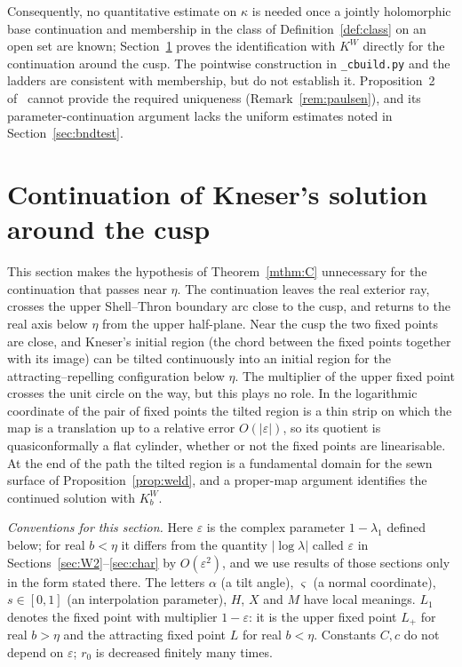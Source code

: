 \documentclass[11pt]{amsart}
\theoremstyle{definition}
\newcommand{\Kk}{K}
\begin{document}
\noindent
Consequently, no quantitative estimate on $\kappa$ is needed once a jointly
holomorphic base continuation and membership in the class of
Definition~\ref{def:class} on an open set are known; Section~\ref{sec:cusp}
proves the identification with $\Kk^W$ directly for the continuation around
the cusp.  The pointwise
construction in \texttt{\_cbuild.py} and the ladders are consistent with
membership, but do not establish it.  Proposition~2 of~\cite{Paulsen2019}
cannot provide the required uniqueness (Remark~\ref{rem:paulsen}), and its
parameter-continuation argument lacks the uniform estimates noted in
Section~\ref{sec:bndtest}.

\section{Continuation of Kneser's solution around the cusp}\label{sec:cusp}

This section makes the hypothesis of Theorem~\ref{mthm:C} unnecessary for
the continuation that passes near $\eta$.  The continuation leaves the real
exterior ray, crosses the upper Shell--Thron boundary arc close to the
cusp, and returns to the real axis below $\eta$ from the upper
half-plane.  Near the cusp the two fixed points are close, and Kneser's
initial region (the chord between the fixed points together with its
image) can be tilted continuously into an initial region for the
attracting--repelling configuration below $\eta$.  The multiplier of the
upper fixed point crosses the unit circle on the way, but this plays no
role.  In the logarithmic coordinate of the pair of fixed points the
tilted region is a thin strip on which the map is a translation up to a
relative error $O(|\varepsilon|)$, so its quotient is quasiconformally a flat
cylinder, whether or not the fixed points are linearisable.  At the end
of the path the tilted region is a fundamental domain for the sewn surface
of Proposition~\ref{prop:weld}, and a proper-map argument identifies the
continued solution with $\Kk^W_b$.

\emph{Conventions for this section.}  Here $\varepsilon$ is the complex parameter
$1-\lambda_1$ defined below; for real $b<\eta$ it differs from the quantity
$|\log\lambda|$ called $\varepsilon$ in Sections~\ref{sec:W2}--\ref{sec:char} by $O(\varepsilon^2)$, and
we use results of those sections only in the form stated there.  The letters
$\alpha$ (a tilt angle), $\varsigma$ (a normal coordinate), $s\in[0,1]$ (an
interpolation parameter), $H$, $X$ and $M$ have local meanings.  $L_1$ denotes
the fixed point with multiplier $1-\varepsilon$: it is the upper fixed point $L_+$ for
real $b>\eta$ and the attracting fixed point $L$ for real $b<\eta$.  Constants
$C,c$ do not depend on $\varepsilon$; $r_0$ is decreased finitely many times.
\end{document}
